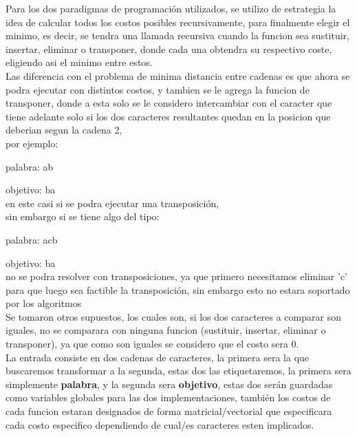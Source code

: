 Para los dos paradigmas de programación utilizados, se utilizo de estrategia la idea de calcular todos los costos posibles recursivamente, para finalmente elegir el minimo, es decir, se tendra una llamada recursiva cuando la funcion sea sustituir, insertar, eliminar o transponer, donde cada una obtendra su respectivo coste, eligiendo asi el minimo entre estos.\\
Las diferencia con el problema de minima distancia entre cadenas es que ahora se podra ejecutar con distintos costos, y tambien se le agrega la funcion de transponer, donde a esta solo se le considero intercambiar con el caracter que tiene adelante solo si los dos caracteres resultantes quedan en la posicion que deberian segun la cadena 2, \\por ejemplo:

palabra: ab

objetivo: ba\\ 
en este casi si se podra ejecutar una transposición, \\sin embargo si se tiene algo del tipo:

palabra: acb

objetivo: ba\\ 
no se podra resolver con transposiciones, ya que primero necesitamos eliminar 'c' para que luego sea factible la transposición, sin embargo esto no estara soportado por los algoritmos\\
Se tomaron otros supuestos, los cuales son, si los dos caracteres a comparar son iguales, no se comparara con ninguna funcion (sustituir, insertar, eliminar o transponer), ya que como son iguales se considero que el costo sera 0.
\\ 
La entrada consiste en dos cadenas de caracteres, la primera sera la que buscaremos transformar a la segunda, estas dos las etiquetaremos, la primera sera simplemente \textbf{palabra}, y la segunda sera \textbf{objetivo}, estas dos serán guardadas como variables globales para las dos implementaciones, también los costos de cada funcion estaran designados de forma matricial/vectorial que especificara cada costo especifico dependiendo de cual/es caracteres esten implicados.




